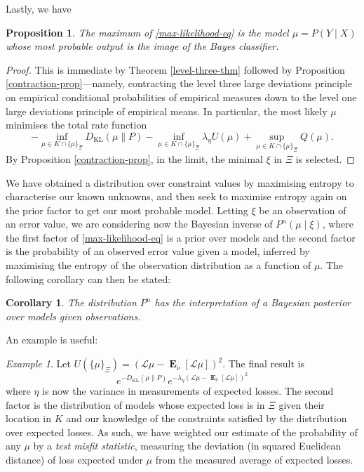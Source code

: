 \documentclass[11pt]{amsart}
\numberwithin{equation}{section}
\newtheorem{corollary}{Corollary}[section]
\newtheorem{prop}{Proposition}[section]
\theoremstyle{remark}
\theoremstyle{remark}
\newtheorem{example}{Example}[section]
\DeclareMathOperator{\E}{\mathbf{E}}
\newcommand{\lag}{\mathcal{L}}
\begin{document}
Lastly, we have 

\pagebreak

\begin{prop}
    The maximum of \eqref{max-likelihood-eq} is the model $\mu = P(Y \mid X)$ whose most probable output is the image of the Bayes classifier. 
\end{prop}
\begin{proof}
    This is immediate by Theorem \ref{level-three-thm} followed by Proposition \ref{contraction-prop}---namely, contracting the level three large deviations principle on empirical conditional probabilities of empirical measures down to the level one large deviations principle of empirical means. In particular, the most likely $\mu$ minimises the total rate function
    \[
        -\inf_{\mu \in K \cap \{\mu\}_\Xi} D_{\mathrm{KL}}(\mu \| P) -\inf_{\mu \in K \cap \{\mu\}_\Xi}\lambda_\eta U(\mu) + \sup_{\mu \in K \cap \{\mu\}_\Xi} Q(\mu).
    \]
    By Proposition \ref{contraction-prop}, in the limit, the minimal $\xi$ in $\Xi$ is selected. 
\end{proof}

We have obtained a distribution over constraint values by maximising entropy to characterise our known unknowns, and then seek to maximise entropy again on the prior factor to get our most probable model. Letting $\xi$ be an observation of an error value, we are considering now the Bayesian inverse of $P^n(\mu \mid \xi)$, where the first factor of \eqref{max-likelihood-eq} is a prior over models and the second factor is the probability of an observed error value given a model, inferred by maximising the entropy of the observation distribution as a function of $\mu$. The following corollary can then be stated: 

\begin{corollary}
    The distribution $P^n$ has the interpretation of a Bayesian posterior over models given observations. 
\end{corollary}

An example is useful: 

\begin{example}
    Let $U(\{\mu\}_\Xi) = (\lag\mu - \E_\nu[\lag\mu])^2$. The final result is 
    \[
    e^{-D_{\mathrm{KL}}(\mu \| P)}e^{-\lambda_\eta(\lag\mu - \E_\nu[\lag\mu])^2} 
    \]
    where $\eta$ is now the variance in measurements of expected losses. The second factor is the distribution of models whose expected loss is in $\Xi$ given their location in $K$ and our knowledge of the constraints satisfied by the distribution over expected losses. As such, we have weighted our estimate of the probability of any $\mu$ by a {\it test misfit statistic}, measuring the deviation (in squared Euclidean distance) of loss expected under $\mu$ from the measured average of expected losses. 
\end{example}
\end{document}
